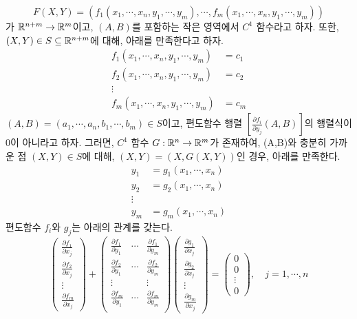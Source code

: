 \begin{theorem}
$$
F(X,Y)=(f_1(x_1,\cdots,x_n,y_1,\cdots,y_m),\cdots,f_m(x_1,\cdots,x_n,y_1,\cdots,y_m))
$$
가 $\mathbb{R}^{n+m} \to \mathbb{R}^m$이고, $(A,B)$를 포함하는 작은 영역에서 $C^1$ 함수라고 하자. 또한, $(X,Y) \in S \subseteq \mathbb{R}^{n+m}$에 대해, 아래를 만족한다고 하자.
\begin{align*}
f_1(x_1,\cdots,x_n,y_1,\cdots,y_m) &= c_1\\
f_2(x_1,\cdots,x_n,y_1,\cdots,y_m) &= c_2\\
\vdots\\
f_m(x_1,\cdots,x_n,y_1,\cdots,y_m) &= c_m
\end{align*}
$(A,B)=(a_1,\cdots,a_n,b_1,\cdots,b_m) \in S$이고, 편도함수 행렬 $[\frac{\partial f_i}{\partial y_j}(A,B)]$의 행렬식이 0이 아니라고 하자. 그러면, $C^1$ 함수 $G: \mathbb{R}^n \to \mathbb{R}^m$가 존재하여, (A,B)와 충분히 가까운 점 $(X,Y) \in S$에 대해, $(X,Y)=(X,G(X,Y))$인 경우, 아래를 만족한다.
\begin{align*}
y_1 &= g_1(x_1,\cdots,x_n)\\
y_2 &= g_2(x_1,\cdots,x_n)\\
\vdots\\
y_m &= g_m(x_1,\cdots,x_n)
\end{align*}
편도함수 $f_i$와 $g_j$는 아래의 관계를 갖는다.
\begin{equation*}
    \begin{pmatrix}
        \frac{\partial f_1}{\partial x_j} \\
        \frac{\partial f_2}{\partial x_j} \\
        \vdots \\
        \frac{\partial f_m}{\partial x_j}
    \end{pmatrix}
    +
    \begin{pmatrix}
        \frac{\partial f_1}{\partial y_1} & \cdots & \frac{\partial f_1}{\partial y_m}\\
        \frac{\partial f_2}{\partial y_1} & \cdots & \frac{\partial f_2}{\partial y_m}\\
        \vdots &  & \vdots \\
        \frac{\partial f_m}{\partial y_1} & \cdots & \frac{\partial f_m}{\partial y_m}\\
    \end{pmatrix}
    \begin{pmatrix}
        \frac{\partial g_1}{\partial x_j} \\
        \frac{\partial g_2}{\partial x_j} \\
        \vdots \\
        \frac{\partial g_m}{\partial x_j}
    \end{pmatrix}
    =
    \begin{pmatrix}
        0 \\
        0 \\
        \vdots \\
        0
    \end{pmatrix}
    ,\quad
    j=1,\cdots,n
\end{equation*}
\end{theorem}

